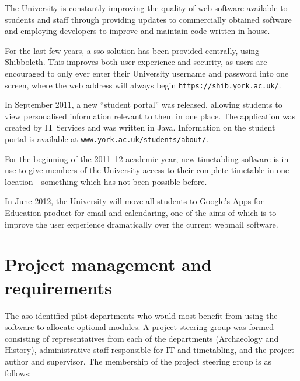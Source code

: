 \documentclass[draft]{scrartcl}
\begin{document}

The University is constantly improving the quality of web software available
to students and staff through providing updates to commercially obtained
software and employing developers to improve and maintain code written
in-house.

For the last few years, a \gls{sso} solution has been provided
centrally, using Shibboleth. This improves both user experience and security,
as users are encouraged to only ever enter their University username and
password into one screen, where the web address will always begin
\texttt{https://shib.york.ac.uk/}.

In September 2011, a new ``student portal'' was released, allowing students to
view personalised information relevant to them in one place. The application
was created by IT Services and was written in Java. Information on the student
portal is available at
\texttt{\href{https://www.york.ac.uk/students/about/}{www.york.ac.uk/students/about/}}.

For the beginning of the 2011--12 academic year, new timetabling software is in
use to give members of the University access to their complete timetable in
one location---something which has not been possible before.

In June 2012, the University will move all students to Google's Apps for
Education product for email and calendaring, one of the aims of which is to
improve the user experience dramatically over the current webmail software.

\section{Project management and requirements}
\label{sec:requirements}

The \gls{aso} identified pilot departments who would most benefit from using
the software to allocate optional modules. A project steering group was formed
consisting of representatives from each of the departments (Archaeology and
History), administrative staff responsible for IT and timetabling, and the
project author and supervisor. The membership of the project steering group is
as follows:
\end{document}
